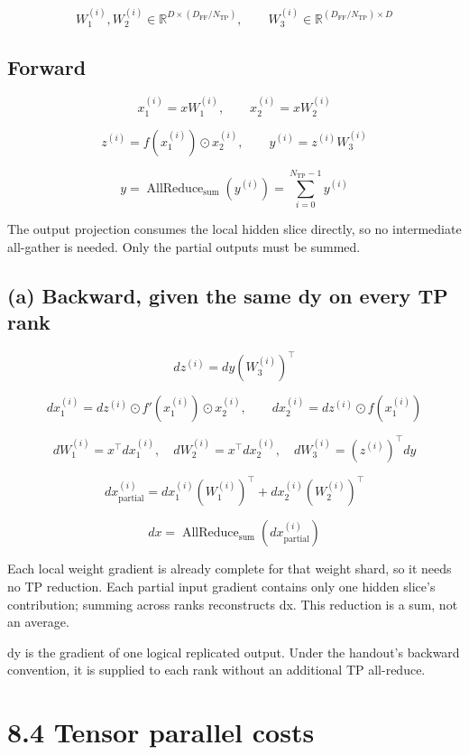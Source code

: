 \documentclass[10pt,a4paper]{article}
\begin{document}
\[W_1^{(i)},W_2^{(i)}\in\mathbb{R}^{D\times(D_{\mathrm{FF}}/N_{\mathrm{TP}})},\qquad W_3^{(i)}\in\mathbb{R}^{(D_{\mathrm{FF}}/N_{\mathrm{TP}})\times D}\]

\subsection*{Forward}

\[x_1^{(i)}=xW_1^{(i)},\qquad x_2^{(i)}=xW_2^{(i)}\]

\[z^{(i)}=f(x_1^{(i)})\odot x_2^{(i)},\qquad y^{(i)}=z^{(i)}W_3^{(i)}\]

\[y=\operatorname{AllReduce}_{\mathrm{sum}}\!\left(y^{(i)}\right)=\sum_{i=0}^{N_{\mathrm{TP}}-1}y^{(i)}\]

The output projection consumes the local hidden slice directly, so no intermediate all-gather is needed. Only the partial outputs must be summed.\par

\subsection*{(a) Backward, given the same dy on every TP rank}

\[dz^{(i)}=dy\left(W_3^{(i)}\right)^\top\]

\[dx_1^{(i)}=dz^{(i)}\odot f'(x_1^{(i)})\odot x_2^{(i)},\qquad dx_2^{(i)}=dz^{(i)}\odot f(x_1^{(i)})\]

\[dW_1^{(i)}=x^\top dx_1^{(i)},\quad dW_2^{(i)}=x^\top dx_2^{(i)},\quad dW_3^{(i)}=\left(z^{(i)}\right)^\top dy\]

\[dx_{\mathrm{partial}}^{(i)}=dx_1^{(i)}\left(W_1^{(i)}\right)^\top+dx_2^{(i)}\left(W_2^{(i)}\right)^\top\]

\[\boxed{dx=\operatorname{AllReduce}_{\mathrm{sum}}\!\left(dx_{\mathrm{partial}}^{(i)}\right)}\]

Each local weight gradient is already complete for that weight shard, so it needs no TP reduction. Each partial input gradient contains only one hidden slice's contribution; summing across ranks reconstructs dx. This reduction is a sum, not an average.\par

{\small dy is the gradient of one logical replicated output. Under the handout's backward convention, it is supplied to each rank without an additional TP all-reduce.}\par

\clearpage

\section*{8.4 \textperiodcentered{} Tensor parallel costs}
\end{document}
